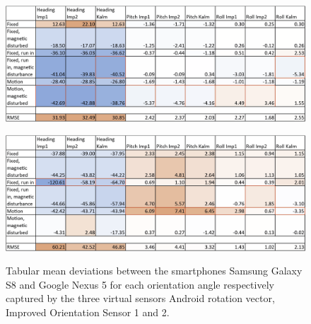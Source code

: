 \documentclass[review]{elsarticle}
\begin{document}
\begin{figure}[htbp!]
\begin{center}
	 	\begin{minipage}{\columnwidth}
	 		\centering
			\subfigure
			{\includegraphics[keepaspectratio, width=1\columnwidth]{graphics/sensor_mean_imu_s8_tab}\label{fig:sensor_sensi:imu_mean_s8_nex5_tab:s8}}
	 	\end{minipage} 
	 	\begin{minipage}{\columnwidth}
	 		\centering
			\subfigure 
			{\includegraphics[keepaspectratio, width=1\columnwidth]{graphics/sensor_mean_imu_nex5_tab}\label{fig:sensor_sensi:imu_mean_s8_nex5_tab:nex5}}
	 	\end{minipage}
		
		\caption{Tabular mean deviations between the smartphones Samsung Galaxy S8 and Google Nexus 5 for each orientation angle respectively captured by the three virtual sensors Android rotation vector, Improved Orientation Sensor 1 and 2. }
	\label{fig:sensor_sensi:imu_mean_s8_nex5_tab}
\end{center}
\end{figure}
\end{document}
